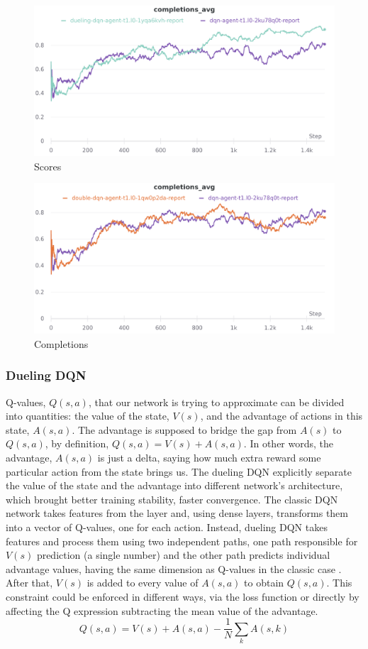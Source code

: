 \documentclass[12pt]{article}
\begin{document}
\begin{figure}[H]
        \centerline{\includegraphics[scale=.2]{res/charts/double_scores.png}}
        \caption{Scores}
\end{figure}

\begin{figure}[H]
        \centerline{\includegraphics[scale=.2]{res/charts/double_completions.png}}
        \caption{Completions}
\end{figure}

\subsubsection{Dueling DQN}
Q-values, $Q(s,a)$, that our network is trying to approximate can be divided into quantities: the value of the state, $V(s)$, and the advantage of actions in this state, $A(s,a)$. The advantage is supposed to bridge the gap from $A(s)$ to $Q(s,a)$, by definition, $Q(s,a)=V(s) + A(s,a)$. In other words, the advantage, $A(s,a)$ is just a delta, saying how much extra reward some particular action from the state brings us. The dueling DQN explicitly separate the value of the state and the advantage into different network's architecture, which brought better training stability, faster convergence. The classic DQN network takes features from the layer and, using dense layers, transforms them into a vector of Q-values, one for each action. Instead, dueling DQN takes features and process them using two independent paths, one path responsible for $V(s)$ prediction (a single number) and the other path predicts individual advantage values, having the same dimension as Q-values in the classic case \cite{dueling-dqn}. After that, $V(s)$ is added to every value of $A(s,a)$ to obtain $Q(s,a)$. 
This constraint could be enforced in different ways, via the loss function or directly by affecting the Q expression subtracting the mean value of the advantage.
\[ Q(s,a)= V(s) + A(s,a) - \frac{1}{N} \sum_k A(s,k) \]
\end{document}
